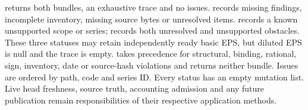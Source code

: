  returns both bundles, an exhaustive trace and
no issues.  records missing findings, incomplete inventory,
missing source bytes or unresolved items.  records a known
unsupported scope or series;  records both unresolved and
unsupported obstacles. These three statuses may retain independently ready
basic EPS, but diluted EPS is null and the trace is empty. 
takes precedence for structural, binding, rational, sign, inventory, date or
source-hash violations and returns neither bundle. Issues are ordered by
path, code and series ID. Every status has an empty mutation list.
Live head freshness, source truth, accounting admission and any future
publication remain responsibilities of their respective application methods.
